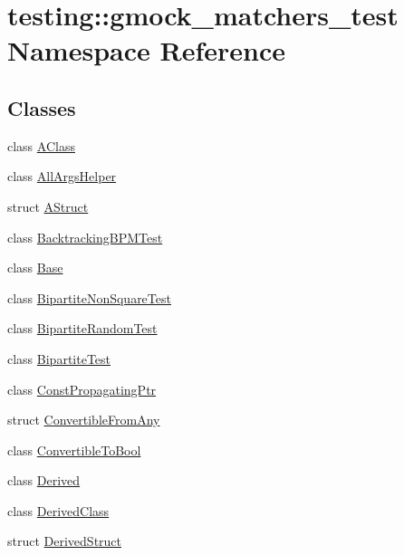 \hypertarget{namespacetesting_1_1gmock__matchers__test}{}\section{testing\+:\+:gmock\+\_\+matchers\+\_\+test Namespace Reference}
\label{namespacetesting_1_1gmock__matchers__test}
\subsection*{Classes}
\begin{DoxyCompactItemize}
\item 
class \hyperlink{classtesting_1_1gmock__matchers__test_1_1AClass}{A\+Class}
\item 
class \hyperlink{classtesting_1_1gmock__matchers__test_1_1AllArgsHelper}{All\+Args\+Helper}
\item 
struct \hyperlink{structtesting_1_1gmock__matchers__test_1_1AStruct}{A\+Struct}
\item 
class \hyperlink{classtesting_1_1gmock__matchers__test_1_1BacktrackingBPMTest}{Backtracking\+B\+P\+M\+Test}
\item 
class \hyperlink{classtesting_1_1gmock__matchers__test_1_1Base}{Base}
\item 
class \hyperlink{classtesting_1_1gmock__matchers__test_1_1BipartiteNonSquareTest}{Bipartite\+Non\+Square\+Test}
\item 
class \hyperlink{classtesting_1_1gmock__matchers__test_1_1BipartiteRandomTest}{Bipartite\+Random\+Test}
\item 
class \hyperlink{classtesting_1_1gmock__matchers__test_1_1BipartiteTest}{Bipartite\+Test}
\item 
class \hyperlink{classtesting_1_1gmock__matchers__test_1_1ConstPropagatingPtr}{Const\+Propagating\+Ptr}
\item 
struct \hyperlink{structtesting_1_1gmock__matchers__test_1_1ConvertibleFromAny}{Convertible\+From\+Any}
\item 
class \hyperlink{classtesting_1_1gmock__matchers__test_1_1ConvertibleToBool}{Convertible\+To\+Bool}
\item 
class \hyperlink{classtesting_1_1gmock__matchers__test_1_1Derived}{Derived}
\item 
class \hyperlink{classtesting_1_1gmock__matchers__test_1_1DerivedClass}{Derived\+Class}
\item 
struct \hyperlink{structtesting_1_1gmock__matchers__test_1_1DerivedStruct}{Derived\+Struct}

\end{DoxyCompactItemize}
